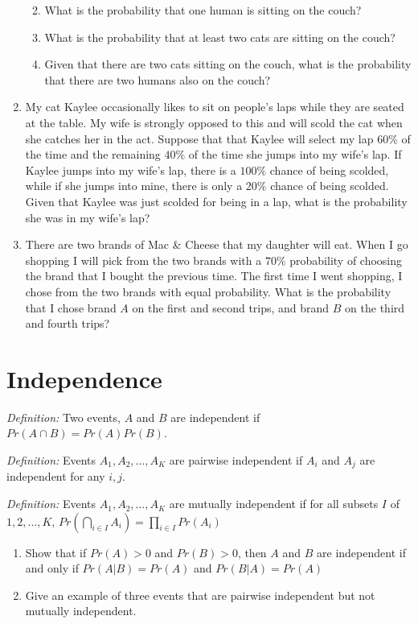 \documentclass[]{book}
\providecommand{\tightlist}{%
  \setlength{\itemsep}{0pt}\setlength{\parskip}{0pt}}
\begin{document}
\begin{enumerate}
  \begin{enumerate}
  \def\labelenumii{\alph{enumii})}
  \tightlist
  \item
    What is the probability that one human is sitting on the couch?
  \item
    What is the probability that at least two cats are sitting on the
    couch?
  \item
    Given that there are two cats sitting on the couch, what is the
    probability that there are two humans also on the couch?
  \end{enumerate}
\item
  My cat Kaylee occasionally likes to sit on people's laps while they
  are seated at the table. My wife is strongly opposed to this and will
  scold the cat when she catches her in the act. Suppose that that
  Kaylee will select my lap \(60\%\) of the time and the remaining
  \(40\%\) of the time she jumps into my wife's lap. If Kaylee jumps
  into my wife's lap, there is a \(100\%\) chance of being scolded,
  while if she jumps into mine, there is only a \(20\%\) chance of being
  scolded. Given that Kaylee was just scolded for being in a lap, what
  is the probability she was in my wife's lap?
\item
  There are two brands of Mac \& Cheese that my daughter will eat. When
  I go shopping I will pick from the two brands with a \(70\%\)
  probability of choosing the brand that I bought the previous time. The
  first time I went shopping, I chose from the two brands with equal
  probability. What is the probability that I chose brand \(A\) on the
  first and second trips, and brand \(B\) on the third and fourth trips?
\end{enumerate}

\section{Independence}\label{independence}

\emph{Definition:} Two events, \(A\) and \(B\) are independent if
\(Pr( A \cap B) = Pr(A)Pr(B)\).

\emph{Definition:} Events \(A_1, A_2,\dots,A_K\) are pairwise
independent if \(A_i\) and \(A_j\) are independent for any \(i,j\).

\emph{Definition:} Events \(A_1, A_2,\dots,A_K\) are mutually
independent if for all subsets \(I\) of \(1,2,\dots,K\),
\(Pr( \bigcap_{i\in I} A_i) = \prod_{i \in I} Pr(A_i)\)

\begin{enumerate}
\def\labelenumi{\arabic{enumi}.}
\item
  Show that if \(Pr(A)>0\) and \(Pr(B)>0\), then \(A\) and \(B\) are
  independent if and only if \(Pr(A|B)=Pr(A)\) and \(Pr(B|A)=Pr(A)\)
\item
  Give an example of three events that are pairwise independent but not
  mutually independent.
\end{enumerate}
\end{document}
